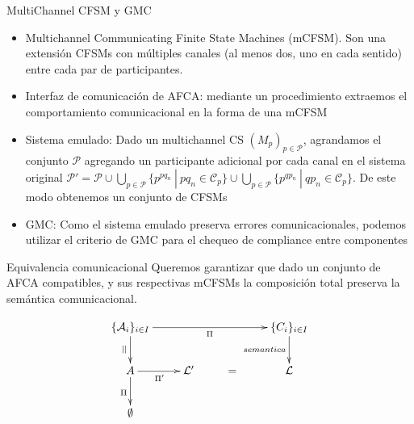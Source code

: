\documentclass[10pt,xcolor={table,dvipsnames},t]{beamer}
\begin{document}
\begin{frame}{MultiChannel CFSM y GMC}
\begin{itemize}
    \item Multichannel Communicating Finite State Machines (mCFSM). Son una extensión CFSMs con múltiples canales (al menos dos, uno en cada sentido) entre cada par de participantes.
    
    \item Interfaz de comunicación de AFCA: mediante un procedimiento extraemos el comportamiento comunicacional en la forma de una mCFSM
    
    \item Sistema emulado: Dado un multichannel CS $(M_p)_{p \in \mathcal{P}}$, agrandamos el conjunto $ \mathcal{P}$ agregando un participante adicional por cada canal en el sistema original $\mathcal{P}'=\mathcal{P} \cup \bigcup_{p \in \mathcal{P}} \{p^{pq_n} \ | \ pq_n \in \mathcal{C}_p \} \cup \bigcup_{p \in \mathcal{P}} \{p^{qp_n} \ | \ qp_n \in \mathcal{C}_p \}$. De este modo obtenemos un conjunto de CFSMs
    
    \item GMC: Como el sistema emulado preserva errores comunicacionales, podemos utilizar el criterio de GMC para el chequeo de compliance entre componentes
\end{itemize}

\end{frame}

\begin{frame}{Equivalencia comunicacional}
Queremos garantizar que dado un conjunto de AFCA compatibles, y sus respectivas mCFSMs la composición total preserva la semántica comunicacional.  

\begin{figure}[H]
$$
\xymatrix{   
	\{\mathcal{A}_i\}_{i \in I} \ar[rrr]_{\Pi} \ar[d]_{||} & & & \{C_i\}_{i \in I}  \ar[d]_{semantica}  \\
	  {A} \ar[r]_{\Pi'} \ar[d]_{\Pi} & \mathcal{L}' & = & {\mathcal{L}}  \\
	  \emptyset
}
$$
\end{figure}
    
\end{frame}
\end{document}
